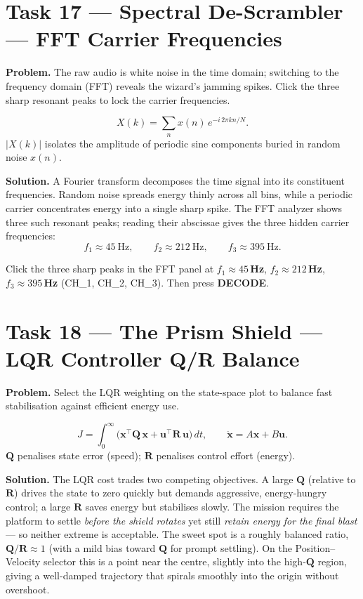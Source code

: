 \documentclass[11pt]{article}
\newcommand{\task}[2]{\section{Task #1 --- #2}}
\begin{document}
\task{17}{Spectral De-Scrambler --- FFT Carrier Frequencies}
\textbf{Problem.} The raw audio is white noise in the time domain; switching to
the frequency domain (FFT) reveals the wizard's jamming spikes. Click the three
sharp resonant peaks to lock the carrier frequencies.

\begin{relbox}
\[
X(k)=\sum_{n} x(n)\,e^{-i\,2\pi kn/N}.
\]
$|X(k)|$ isolates the amplitude of periodic sine components buried in random
noise $x(n)$.
\end{relbox}

\textbf{Solution.} A Fourier transform decomposes the time signal into its
constituent frequencies. Random noise spreads energy thinly across all bins,
while a periodic carrier concentrates energy into a single sharp spike. The FFT
analyzer shows three such resonant peaks; reading their abscissae gives the
three hidden carrier frequencies:
\[
f_1\approx45\ \text{Hz},\qquad f_2\approx212\ \text{Hz},\qquad
f_3\approx395\ \text{Hz}.
\]

\begin{answer}
Click the three sharp peaks in the FFT panel at
\textbf{$f_1\approx45$\,Hz}, \textbf{$f_2\approx212$\,Hz},
\textbf{$f_3\approx395$\,Hz} (CH\_1, CH\_2, CH\_3). Then press \textbf{DECODE}.
\end{answer}

\task{18}{The Prism Shield --- LQR Controller Q/R Balance}
\textbf{Problem.} Select the LQR weighting on the state-space plot to balance
fast stabilisation against efficient energy use.

\begin{relbox}
\[
J=\int_0^{\infty}\!\bigl(\mathbf x^{\!\top}\mathbf Q\,\mathbf x
+\mathbf u^{\!\top}\mathbf R\,\mathbf u\bigr)\,dt,
\qquad \dot{\mathbf x}=A\mathbf x+B\mathbf u .
\]
$\mathbf Q$ penalises state error (speed); $\mathbf R$ penalises control effort (energy).
\end{relbox}

\textbf{Solution.} The LQR cost trades two competing objectives. A large
$\mathbf Q$ (relative to $\mathbf R$) drives the state to zero quickly but
demands aggressive, energy-hungry control; a large $\mathbf R$ saves energy but
stabilises slowly. The mission requires the platform to settle \emph{before the
shield rotates} yet still \emph{retain energy for the final blast} --- so
neither extreme is acceptable. The sweet spot is a roughly balanced ratio,
$\mathbf Q/\mathbf R\approx1$ (with a mild bias toward $\mathbf Q$ for prompt
settling). On the Position--Velocity selector this is a point near the centre,
slightly into the high-$\mathbf Q$ region, giving a well-damped trajectory that
spirals smoothly into the origin without overshoot.
\end{document}
